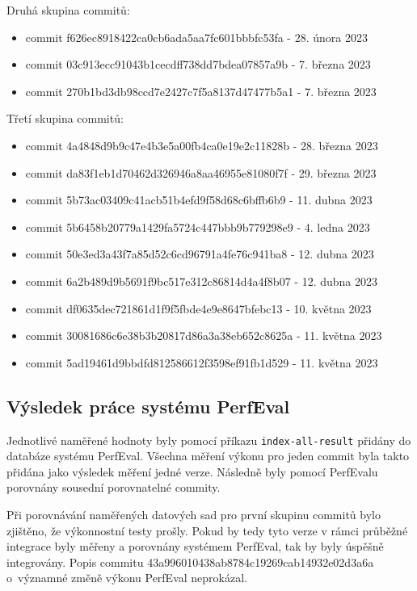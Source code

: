 Druhá skupina commitů:
\begin{itemize}
    \item commit f626ec8918422ca0cb6ada5aa7fc601bbbfc53fa - 28. února 2023
    \item commit 03c913ecc91043b1cecdff738dd7bdea07857a9b - 7. března 2023
    \item commit 270b1bd3db98ccd7e2427c7f5a8137d47477b5a1 - 7. března 2023
\end{itemize}

Třetí skupina commitů:
\begin{itemize}
    \item commit 4a4848d9b9c47e4b3e5a00fb4ca0e19e2c11828b - 28. března 2023
    \item commit da83f1eb1d70462d326946a8aa46955e81080f7f - 29. března 2023
    \item commit 5b73ac03409c41acb51b4efd9f58d68c6bffb6b9 - 11. dubna 2023
    \item commit 5b6458b20779a1429fa5724c447bbb9b779298e9 - 4. ledna 2023
    \item commit 50e3ed3a43f7a85d52c6cd96791a4fe76c941ba8 - 12. dubna 2023
    \item commit 6a2b489d9b5691f9bc517e312c86814d4a4f8b07 - 12. dubna 2023
    \item commit df0635dec721861d1f9f5fbde4e9e8647bfebc13 - 10. května 2023
    \item commit 30081686c6e38b3b20817d86a3a38eb652c8625a - 11. května 2023
    \item commit 5ad19461d9bbdfd812586612f3598ef91fb1d529 - 11. května 2023
\end{itemize}

\subsection{Výsledek práce systému PerfEval}

Jednotlivé naměřené hodnoty byly pomocí příkazu \lstinline{index-all-result} přidány do databáze systému PerfEval.
Všechna měření výkonu pro jeden commit byla takto přidána jako výsledek měření jedné verze.
Následně byly pomocí PerfEvalu porovnány sousední porovnatelné commity.

Při porovnávání naměřených datových sad pro první skupinu commitů bylo zjištěno, že výkonnostní testy prošly.
Pokud by tedy tyto verze v rámci průběžné integrace byly měřeny a porovnány systémem PerfEval, tak by byly úspěšně integrovány.
Popis commitu 43a996010438ab8784c19269cab14932e02d3a6a o~významné změně výkonu PerfEval neprokázal.

